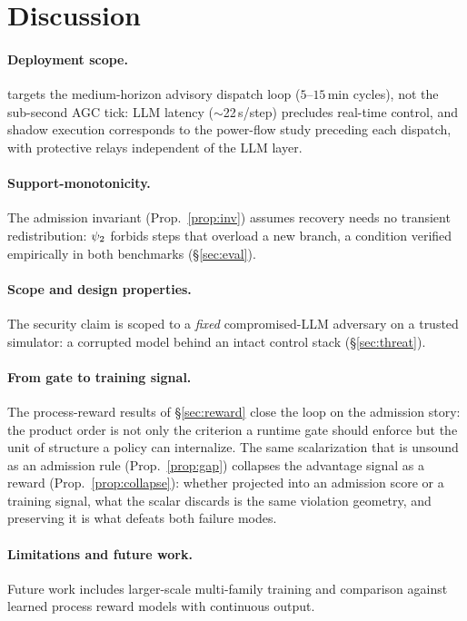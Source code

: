 \section{Discussion}
\label{sec:discussion}

\paragraph{Deployment scope.}
\silr{} targets the medium-horizon advisory dispatch loop ($5$--$15$\,min cycles), not the sub-second AGC tick: LLM latency ($\sim$22\,s/step) precludes real-time control, and shadow execution corresponds to the power-flow study preceding each dispatch, with protective relays independent of the LLM layer.

\paragraph{Support-monotonicity.}
The admission invariant (Prop.~\ref{prop:inv}) assumes recovery needs no transient redistribution: $\psi_2$ forbids steps that overload a new branch, a condition verified empirically in both benchmarks (\S\ref{sec:eval}).

\paragraph{Scope and design properties.}
The security claim is scoped to a \emph{fixed} compromised-LLM adversary on a trusted simulator: a corrupted model behind an intact control stack (\S\ref{sec:threat}).

\paragraph{From gate to training signal.}
The process-reward results of \S\ref{sec:reward} close the loop on the admission story: the product order is not only the criterion a runtime gate should enforce but the unit of structure a policy can internalize. The same scalarization that is unsound as an admission rule (Prop.~\ref{prop:gap}) collapses the advantage signal as a reward (Prop.~\ref{prop:collapse}): whether projected into an admission score or a training signal, what the scalar discards is the same violation geometry, and preserving it is what defeats both failure modes.

\paragraph{Limitations and future work.}
Future work includes larger-scale multi-family training and comparison against learned process reward models with continuous output.
